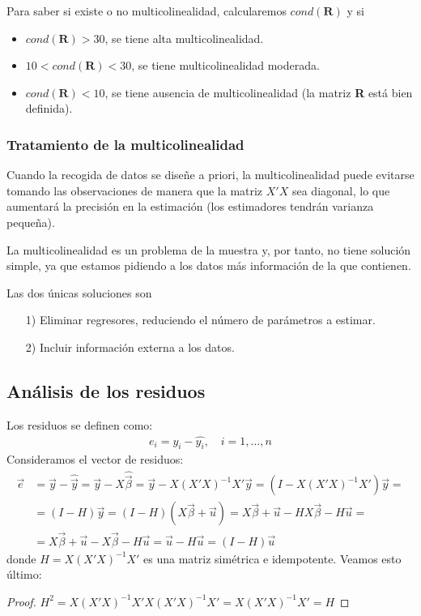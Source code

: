 Para saber si existe o no multicolinealidad, calcularemos $cond(\textbf{R})$ y si
\begin{itemize}
    \item $cond(\textbf{R}) > 30$, se tiene alta multicolinealidad.
    \item $10 < cond(\textbf{R}) < 30$, se tiene multicolinealidad moderada.
    \item $cond(\textbf{R}) < 10$, se tiene ausencia de multicolinealidad (la matriz \textbf{R} está bien definida).
\end{itemize}

\subsubsection{Tratamiento de la multicolinealidad}
Cuando la recogida de datos se diseñe a priori, la multicolinealidad puede evitarse
tomando las observaciones de manera que la matriz $X'X$ sea diagonal, lo que
aumentará la precisión en la estimación (los estimadores tendrán varianza pequeña).

La multicolinealidad es un problema de la muestra y, por tanto, no tiene solución
simple, ya que estamos pidiendo a los datos más información de la que contienen.

Las dos únicas soluciones son
\begin{enumerate}
    \item[1)] Eliminar regresores, reduciendo el número de parámetros a estimar.
    \item[2)] Incluir información externa a los datos.
\end{enumerate}

\subsection{Análisis de los residuos}

Los residuos se definen como:
\begin{align*}
    e_i = y_i - \widehat{y_i}, \quad i = 1, \dots, n
\end{align*}
Consideramos el vector de residuos:
\begin{align*}
    \vec{e} & = \vec{y} - \widehat{\vec{y}} = \vec{y} - X\widehat{\vec{\beta}} = \vec{y} - X(X'X)^{-1}X'\vec{y} = (I - X(X'X)^{-1}X')\vec{y} = \\
            & = (I-H)\vec{y} = (I-H)(X\vec{\beta}+\vec{u}) = X\vec{\beta} + \vec{u} - HX\vec{\beta} - H\vec{u} =                               \\
            & = X\vec{\beta} + \vec{u} - X\vec{\beta} - H\vec{u} = \vec{u} - H\vec{u} = (I-H)\vec{u}
\end{align*}
donde $H = X(X'X)^{-1}X'$ es una matriz simétrica e idempotente. Veamos esto último:
\begin{proof}
    $H^2 = X(X'X)^{-1}X'X(X'X)^{-1}X' = X(X'X)^{-1}X' = H$
\end{proof}

